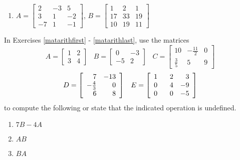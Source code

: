 \documentclass{ximera}
\begin{document}
\begin{enumerate}
\setcounter{enumi}{\value{HW}}

\item  $ A = \left[ \begin{array}{rrr} 2 & -3 & 5 \\ 3 & 1 &-2 \\ -7 & 1 & -1 \end{array} \right]$, $B= \left[ \begin{array}{rrr} 1 & 2 & 1 \\ 17 & 33 & 19 \\ 10 & 19 & 11 \end{array} \right]$ \label{easymatarithlast}

\setcounter{HW}{\value{enumi}}
\end{enumerate}


In Exercises \ref{matarithfirst} - \ref{matarithlast}, use the matrices \[A = \left[ \begin{array}{rr} 1 & 2 \\ 3 & 4 \end{array} \right] \;\;\; B = \left[ \begin{array}{rr} 0 & -3 \\ -5 & 2 \end{array} \right] \;\;\; C = \left[ \begin{array}{rrr} 10 & -\frac{11}{2} & 0 \\ \frac{3}{5} & 5 & 9 \end{array} \right]\] \[ D = \left[ \begin{array}{rr} 7 & -13 \\ -\frac{4}{3} & 0 \\ 6 & 8 \end{array} \right] \;\;\; E = \left[ \begin{array}{rrr} 1 & \hphantom{-}2 & 3 \\ 0 & 4 & -9 \\ 0 & 0 & -5 \end{array} \right] \] to compute the following or state that the indicated operation is undefined.

\begin{multicols}{3} 
\begin{enumerate}
\setcounter{enumi}{\value{HW}}

\item $7B - 4A$  \label{matarithfirst}
\item $AB$
\item $BA$

\setcounter{HW}{\value{enumi}}
\end{enumerate}
\end{multicols}
\end{document}
